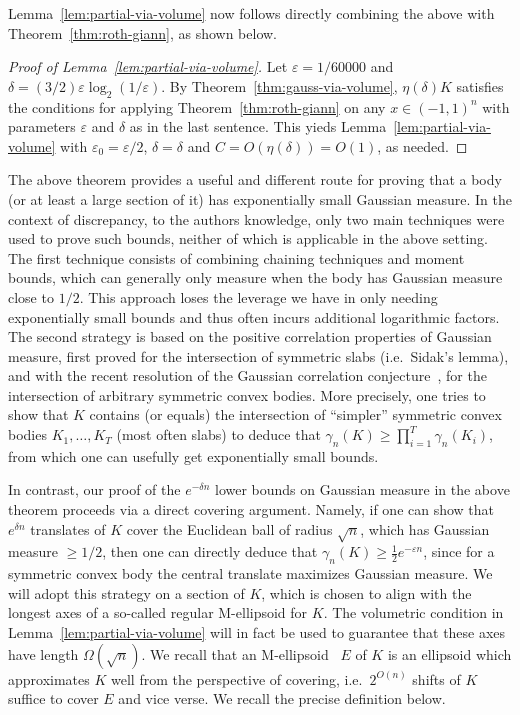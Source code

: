 \documentclass[12pt]{article}
\newcommand\eps{\varepsilon}
\begin{document}
Lemma~\ref{lem:partial-via-volume} now follows directly combining the above with
Theorem~\ref{thm:roth-giann}, as shown below.

\begin{proof}[Proof of Lemma~\ref{lem:partial-via-volume}] 
Let $\eps = 1/60000$ and $\delta = (3/2) \eps \log_2(1/\eps)$. By
Theorem~\ref{thm:gauss-via-volume}, $\eta(\delta) K$ satisfies the conditions
for applying Theorem~\ref{thm:roth-giann} on any $x \in (-1,1)^n$ with
parameters $\eps$ and $\delta$ as in the last sentence. This yieds
Lemma~\ref{lem:partial-via-volume} with $\eps_0 = \eps/2$, $\delta = \delta$ and
$C = O(\eta(\delta)) = O(1)$, as needed.   
\end{proof}

The above theorem provides a useful and different route for proving that a body
(or at least a large section of it) has exponentially small Gaussian measure. In
the context of discrepancy, to the authors knowledge, only two main techniques
were used to prove such bounds, neither of which is applicable in the above
setting. The first technique consists of combining chaining techniques and
moment bounds, which can generally only measure when the body has Gaussian
measure close to $1/2$.  This approach loses the leverage we have in only
needing exponentially small bounds and thus often incurs additional
logarithmic factors. The second strategy is based on the positive correlation
properties of Gaussian measure, first proved for the intersection of symmetric
slabs (i.e.~Sidak's lemma), and with the recent resolution of the Gaussian
correlation conjecture~\cite{Royen14}, for the intersection of arbitrary
symmetric convex bodies. More precisely, one tries to show that $K$ contains (or
equals) the intersection of ``simpler'' symmetric convex bodies $K_1,\dots,K_T$
(most often slabs) to deduce that $\gamma_n(K) \geq \prod_{i=1}^T
\gamma_n(K_i)$, from which one can usefully get exponentially small bounds.

In contrast, our proof of the $e^{-\delta n}$ lower bounds on Gaussian measure
in the above theorem proceeds via a direct covering argument. Namely, if one can
show that $e^{\delta n}$ translates of $K$ cover the Euclidean ball of radius
$\sqrt{n}$, which has Gaussian measure $\geq 1/2$, then one can directly deduce
that $\gamma_n(K) \geq \frac{1}{2} e^{-\eps n}$, since for a symmetric convex
body the central translate maximizes Gaussian measure. We will adopt this
strategy on a section of $K$, which is chosen to align with the longest axes of a
so-called regular M-ellipsoid for $K$. The volumetric condition in
Lemma~\ref{lem:partial-via-volume} will in fact be used to guarantee that these
axes have length $\Omega(\sqrt{n})$. We recall that an
M-ellipsoid~\cite{Milman86-reverseBM} $E$ of $K$ is an ellipsoid which
approximates $K$ well from the perspective of covering, i.e.~$2^{O(n)}$ shifts
of $K$ suffice to cover $E$ and vice verse. We recall the precise
definition below. 
\end{document}
